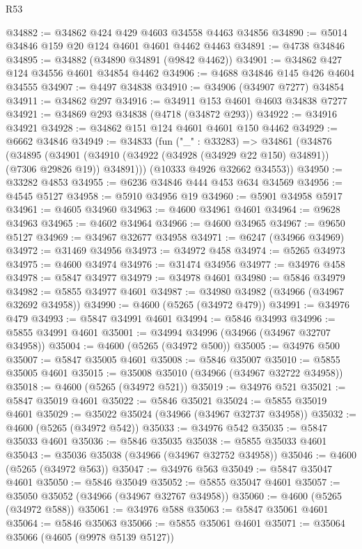 \begin{lexlean}{R53}
\begin{coremodule}
@34882 := @34862 @424 @429 @4603 @34558 @4463 @34856
@34890 := @5014 @34846 @159 @20 @124 @4601 @4601 @4462 @4463
@34891 := @4738 @34846
@34895 := @34882 (@34890 @34891 (@9842 @4462))
@34901 := @34862 @427 @124 @34556 @4601 @34854 @4462
@34906 := @4688 @34846 @145 @426 @4604 @34555
@34907 := @4497 @34838
@34910 := @34906 (@34907 @7277) @34854
@34911 := @34862 @297
@34916 := @34911 @153 @4601 @4603 @34838 @7277
@34921 := @34869 @293 @34838 (@4718 (@34872 @293))
@34922 := @34916 @34921
@34928 := @34862 @151 @124 @4601 @4601 @150 @4462
@34929 := @6662 @34846
@34949 := @34833
    (fun ("_" : @33283) =>
    @34861
      (@34876
        (@34895
          (@34901 (@34910 (@34922 (@34928 (@34929 @22 @150) @34891)) (@7306 @29826 @19)) @34891)))
      (@10333 @4926 @32662 @34553))
@34950 := @33282 @4853
@34955 := @6236 @34846 @444 @453 @634 @34569
@34956 := @4545 @5127
@34958 := @5910 @34956 @19
@34960 := @5901 @34958 @5917
@34961 := @4605 @34960
@34963 := @4600 @34961 @4601
@34964 := @9628 @34963
@34965 := @4602 @34964
@34966 := @4600 @34965
@34967 := @9650 @5127
@34969 := @34967 @32677 @34958
@34971 := @6247 (@34966 @34969)
@34972 := @31469 @34956
@34973 := @34972 @458
@34974 := @5265 @34973
@34975 := @4600 @34974
@34976 := @31474 @34956
@34977 := @34976 @458
@34978 := @5847 @34977
@34979 := @34978 @4601
@34980 := @5846 @34979
@34982 := @5855 @34977 @4601
@34987 := @34980 @34982 (@34966 (@34967 @32692 @34958))
@34990 := @4600 (@5265 (@34972 @479))
@34991 := @34976 @479
@34993 := @5847 @34991 @4601
@34994 := @5846 @34993
@34996 := @5855 @34991 @4601
@35001 := @34994 @34996 (@34966 (@34967 @32707 @34958))
@35004 := @4600 (@5265 (@34972 @500))
@35005 := @34976 @500
@35007 := @5847 @35005 @4601
@35008 := @5846 @35007
@35010 := @5855 @35005 @4601
@35015 := @35008 @35010 (@34966 (@34967 @32722 @34958))
@35018 := @4600 (@5265 (@34972 @521))
@35019 := @34976 @521
@35021 := @5847 @35019 @4601
@35022 := @5846 @35021
@35024 := @5855 @35019 @4601
@35029 := @35022 @35024 (@34966 (@34967 @32737 @34958))
@35032 := @4600 (@5265 (@34972 @542))
@35033 := @34976 @542
@35035 := @5847 @35033 @4601
@35036 := @5846 @35035
@35038 := @5855 @35033 @4601
@35043 := @35036 @35038 (@34966 (@34967 @32752 @34958))
@35046 := @4600 (@5265 (@34972 @563))
@35047 := @34976 @563
@35049 := @5847 @35047 @4601
@35050 := @5846 @35049
@35052 := @5855 @35047 @4601
@35057 := @35050 @35052 (@34966 (@34967 @32767 @34958))
@35060 := @4600 (@5265 (@34972 @588))
@35061 := @34976 @588
@35063 := @5847 @35061 @4601
@35064 := @5846 @35063
@35066 := @5855 @35061 @4601
@35071 := @35064 @35066 (@4605 (@9978 @5139 @5127))

\end{coremodule}
\end{lexlean}

